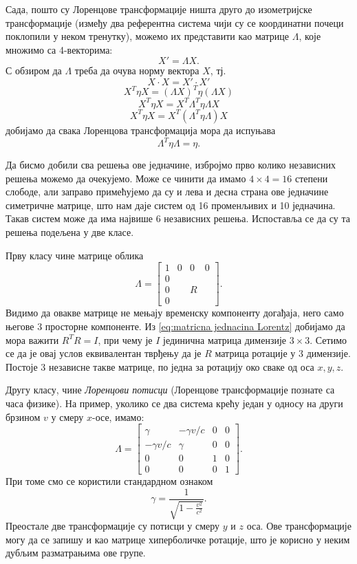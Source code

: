\documentclass{report}
\theoremstyle{plain}
\theoremstyle{definition}
\begin{document}
Сада, пошто су Лоренцове трансформације ништа друго до изометријске трансформације (између два референтна система чији су се координатни почеци поклопили у неком тренутку), можемо их представити као матрице $\Lambda$, које множимо са 4-векторима:
$$X' = \Lambda X.$$
С обзиром да $\Lambda$ треба да очува норму вектора $X$, тј.
$$ X\cdot X = X'\cdot X'$$
$$X^T\eta X = (\Lambda X)^T\eta (\Lambda X)$$
$$X^T\eta X = X^T \Lambda^T\eta \Lambda X$$
$$X^T\eta X = X^T (\Lambda^T\eta \Lambda) X$$
добијамо да свака Лоренцова трансформација мора да испуњава
\label{dokaz za pseudoortogonalnu kvadratnu formu}
\begin{equation}
\label{eq:matricna jednacina Lorentz}
\Lambda^T \eta \Lambda = \eta. \tag{*}
\end{equation}

Да бисмо добили сва решења ове једначине, избројмо прво колико независних решења можемо да очекујемо. Може се чинити да имамо $4\times 4 = 16$ степени слободе, али заправо примећујемо да су и лева и десна страна ове једначине симетричне матрице, што нам даје систем од 16 променљивих и 10 једначина. Такав систем може да има највише 6 независних решења. Испоставља се да су та решења подељена у две класе.

Прву класу чине матрице облика
$$\Lambda = \begin{bmatrix}
    1 & 0 & 0 & 0 \\
    0 &   &   &   \\
    0 &   & R &   \\
    0 &   &   &
  \end{bmatrix}.$$
Видимо да овакве матрице не мењају временску компоненту догађаја, него само његове 3 просторне компоненте. Из \eqref{eq:matricna jednacina Lorentz} добијамо да мора важити $R^T R = I$, при чему је $I$ јединична матрица димензије $3\times 3$. Сетимо се да је овај услов еквивалентан тврђењу да је $R$ матрица ротације у 3 димензије. Постоје 3 независне такве матрице, по једна за ротацију око сваке од оса $x, y, z$.

Другу класу, чине \emph{Лоренцови потисци} (Лоренцове трансформације познате са часа физике). На пример, уколико се два система крећу један у односу на други брзином $v$ у смеру $x$-осе, имамо:
$$\Lambda = \begin{bmatrix}
    \gamma & -\gamma v/c & 0 & 0 \\
    -\gamma v/c & \gamma & 0 & 0 \\
    0 &  0 & 1 & 0  \\
    0 & 0  & 0 & 1
  \end{bmatrix}.$$
При томе смо се користили стандардном ознаком
$$\gamma = \frac{1}{\sqrt{1-\frac{v^2}{c^2}}}.$$
Преостале две трансформације су потисци у смеру $y$ и $z$ оса. Ове трансформације могу да се запишу и као матрице хиперболичке ротације, што је корисно у неким дубљим разматрањима ове групе.
\end{document}
